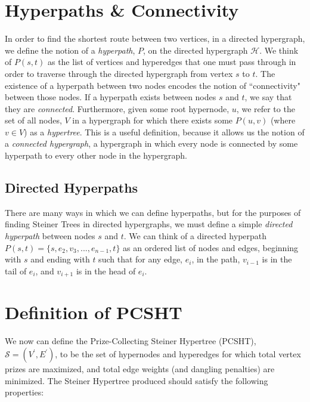 \documentclass[12pt,twoside]{reedthesis}
\theoremstyle{definition}
\begin{document}
\section{Hyperpaths \& Connectivity}
In order to find the shortest route between two vertices, in a directed hypergraph, we define the notion of a \textit{hyperpath}, $P$, on the directed hypergraph $\mathcal{H}$.  We think of $P(s,t)$ as the list of vertices and hyperedges that one must pass through in order to traverse through the directed hypergraph from vertex $s$ to $t$. The existence of a hyperpath between two nodes encodes the notion of ``connectivity" between those nodes.  If a hyperpath exists between nodes $s$ and $t$, we say that they are \textit{connected}. Furthermore, given some root hypernode, $u$, we refer to the set of all nodes, $V$ in a hypergraph for which there exists some $P(u,v)$ (where $v \in V$) as a \textit{hypertree}. This is a useful definition, because it allows us the notion of a \textit{connected hypergraph}, a hypergraph in which every node is connected by some hyperpath to every other node in the hypergraph.\par

\subsection{Directed Hyperpaths}

There are many ways in which we can define hyperpaths, but for the purposes of finding Steiner Trees in directed hypergraphs, we must define a simple \textit{directed hyperpath} between nodes $s$ and $t$. We can think of a directed hyperpath $P(s,t)=\{s,e_2,v_3,...,e_{n-1},t\}$ as an ordered list of nodes and edges, beginning with $s$ and ending with $t$ such that for any edge, $e_i$, in the path, $v_{i-1}$ is in the tail of $e_i$, and $v_{i+1}$ is in the head of $e_i$.\par

\section{Definition of PCSHT}

We now can define the Prize-Collecting Steiner Hypertree (PCSHT), $\mathcal{S} = (V^\prime,E^\prime)$, to be the set of hypernodes and hyperedges for which total vertex prizes are maximized, and total edge weights (and dangling penalties) are minimized.  The Steiner Hypertree produced should satisfy the following properties:
\end{document}
